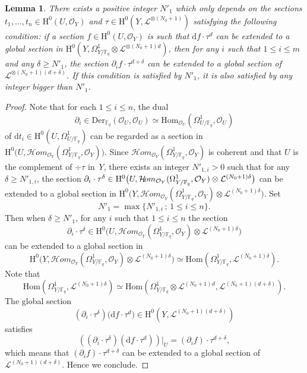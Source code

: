\documentclass[11pt]{article}
\numberwithin{equation}{section}
\newcommand{\sep}{\,;\,}
\newcommand{\cHom}{\mathcal{H}\!om}
\theoremstyle{plain}
\newtheorem{lem}[thm]{Lemma}
\theoremstyle{definition}
\newcommand{\ho}{\mathrm{H}}
\newcommand{\Hom}{\mathrm{Hom}}
\newcommand{\li}{\mathcal{L}}
\newcommand{\F}{\mathbb{F}}
\begin{document}
\begin{lem}\label{beforeextend}
There exists a positive integer $N'_1$ which only depends on the sections $t_1,\dots, t_n\in \ho^0(U, \mathcal{O}_Y)$ and $\tau\in \ho^0(Y, \li^{\otimes (N_0+1)})$ satisfying the following condition: if a section $f \in \ho^0(U, \mathcal{O}_Y)$ is such that $\mathrm{d}f\cdot \tau^{d}$ can be extended to a global section in $\ho^0(Y, \Omega_{Y/\F_q}^1\otimes \li^{\otimes(N_0+1)d})$, then for any $i$ such that $1\leq i\leq m$ and any $\delta \geq N'_1$, the section $\partial_i f \cdot \tau^{d+\delta}$ can be extended to a global section of $\li^{\otimes (N_0+1)(d+\delta)}$. If this condition is satisfied by $N'_1$, it is also satisfied by any integer bigger than $N'_1$.
\end{lem}
\begin{proof}[Proof]
Note that for each $1\leq i\leq n$, the dual
\[
\partial_i\in \mathrm{Der}_{\F_q}(\mathcal{O}_U, \mathcal{O}_U)\simeq \Hom_{\mathcal{O}_U}(\Omega^1_{U/\F_q}, \mathcal{O}_U)
\]
of $\mathrm{d}t_i\in \ho^0(U, \Omega^1_{U/\F_q})$ can be regarded as a section in $\ho^0\bigl(U, \cHom_{\mathcal{O}_Y}(\Omega^1_{Y/\F_q}, \mathcal{O}_Y) \bigr)$. Since $\cHom_{\mathcal{O}_Y}(\Omega^1_{Y/\F_q}, \mathcal{O}_Y)$ is coherent and that $U$ is the complement of $\div \tau$ in~$Y$, there exists an integer $N'_{1,i}>0$ such that for any $\delta\geq N'_{1,i}$, the section $\partial_i\cdot\nobreak \tau^{\delta}\in \ho^0\bigl(U, \cHom_{\mathcal{O}_Y}(\Omega^1_{Y/\F_q}, \mathcal{O}_Y)\otimes \li^{(N_0+1)\delta} \bigr)$ can be extended to a global section in $\ho^0\bigl(Y, \cHom_{\mathcal{O}_Y}(\Omega^1_{Y/\F_q}, \mathcal{O}_Y)\otimes \li^{(N_0+1)\delta} \bigr)$. Set\vspace*{-3pt}
\[
N'_1=\max \{ N'_{1,i}\sep 1\leq i\leq n\}.
\]
Then when $\delta\geq N'_1$, for any $i$ such that $1\leq i\leq n$ the section\vspace*{-3pt}
\[
\partial_i\cdot \tau^{\delta}\in \ho^0\bigl(U, \cHom_{\mathcal{O}_Y}(\Omega^1_{Y/\F_q}, \mathcal{O}_Y)\otimes \li^{(N_0+1)\delta} \bigr)
\]
can be extended to a global section in\vspace*{-3pt}
\[
\ho^0\bigl(Y, \cHom_{\mathcal{O}_Y}(\Omega^1_{Y/\F_q}, \mathcal{O}_Y)\otimes \li^{(N_0+1)\delta} \bigr)\simeq \Hom(\Omega^1_{Y/\F_q}, \li^{(N_0+1)\delta}).
\]
Note that\vspace*{-3pt}
\[
\Hom(\Omega^1_{Y/\F_q}, \li^{(N_0+1)\delta}) \simeq \Hom(\Omega^1_{Y/\F_q}\otimes \li^{(N_0+1)d}, \li^{(N_0+1)(d+\delta)}).
\]
The global section\vspace*{-3pt}
\[
(\partial_i\cdot \tau^{\delta})\big(\mathrm{d}f\cdot \tau^{d} \big)\in \ho^0(Y, \li^{(N_0+1)(d+\delta)})
\]
satisfies\vspace*{-3pt}
\[
\left((\partial_i\cdot \tau^{\delta})(\mathrm{d}f\cdot \tau^{d})\right)\big|_U= \left(\partial_i f \right)\cdot \tau^{d+\delta},
\]
which means that $\left(\partial_i f \right)\cdot \tau^{d+\delta}$ can be extended to a global section of $\li^{(N_0+1)(d+\delta)}$. Hence we conclude.
\end{proof}
\end{document}
